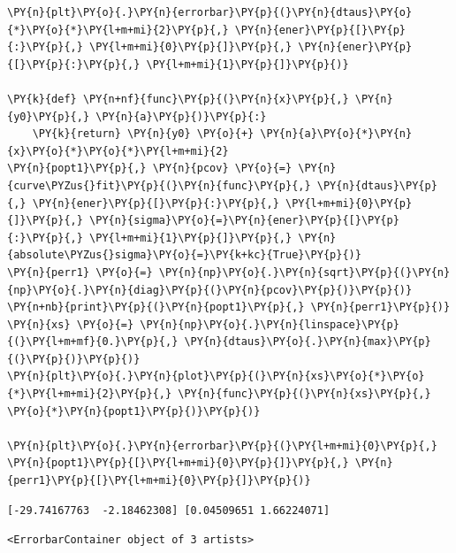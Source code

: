     \begin{tcolorbox}[breakable, size=fbox, boxrule=1pt, pad at break*=1mm,colback=cellbackground, colframe=cellborder]
\begin{Verbatim}[commandchars=\\\{\}]
\PY{n}{plt}\PY{o}{.}\PY{n}{errorbar}\PY{p}{(}\PY{n}{dtaus}\PY{o}{*}\PY{o}{*}\PY{l+m+mi}{2}\PY{p}{,} \PY{n}{ener}\PY{p}{[}\PY{p}{:}\PY{p}{,} \PY{l+m+mi}{0}\PY{p}{]}\PY{p}{,} \PY{n}{ener}\PY{p}{[}\PY{p}{:}\PY{p}{,} \PY{l+m+mi}{1}\PY{p}{]}\PY{p}{)}

\PY{k}{def} \PY{n+nf}{func}\PY{p}{(}\PY{n}{x}\PY{p}{,} \PY{n}{y0}\PY{p}{,} \PY{n}{a}\PY{p}{)}\PY{p}{:}
    \PY{k}{return} \PY{n}{y0} \PY{o}{+} \PY{n}{a}\PY{o}{*}\PY{n}{x}\PY{o}{*}\PY{o}{*}\PY{l+m+mi}{2}
\PY{n}{popt1}\PY{p}{,} \PY{n}{pcov} \PY{o}{=} \PY{n}{curve\PYZus{}fit}\PY{p}{(}\PY{n}{func}\PY{p}{,} \PY{n}{dtaus}\PY{p}{,} \PY{n}{ener}\PY{p}{[}\PY{p}{:}\PY{p}{,} \PY{l+m+mi}{0}\PY{p}{]}\PY{p}{,} \PY{n}{sigma}\PY{o}{=}\PY{n}{ener}\PY{p}{[}\PY{p}{:}\PY{p}{,} \PY{l+m+mi}{1}\PY{p}{]}\PY{p}{,} \PY{n}{absolute\PYZus{}sigma}\PY{o}{=}\PY{k+kc}{True}\PY{p}{)}
\PY{n}{perr1} \PY{o}{=} \PY{n}{np}\PY{o}{.}\PY{n}{sqrt}\PY{p}{(}\PY{n}{np}\PY{o}{.}\PY{n}{diag}\PY{p}{(}\PY{n}{pcov}\PY{p}{)}\PY{p}{)}
\PY{n+nb}{print}\PY{p}{(}\PY{n}{popt1}\PY{p}{,} \PY{n}{perr1}\PY{p}{)}
\PY{n}{xs} \PY{o}{=} \PY{n}{np}\PY{o}{.}\PY{n}{linspace}\PY{p}{(}\PY{l+m+mf}{0.}\PY{p}{,} \PY{n}{dtaus}\PY{o}{.}\PY{n}{max}\PY{p}{(}\PY{p}{)}\PY{p}{)}
\PY{n}{plt}\PY{o}{.}\PY{n}{plot}\PY{p}{(}\PY{n}{xs}\PY{o}{*}\PY{o}{*}\PY{l+m+mi}{2}\PY{p}{,} \PY{n}{func}\PY{p}{(}\PY{n}{xs}\PY{p}{,} \PY{o}{*}\PY{n}{popt1}\PY{p}{)}\PY{p}{)}

\PY{n}{plt}\PY{o}{.}\PY{n}{errorbar}\PY{p}{(}\PY{l+m+mi}{0}\PY{p}{,} \PY{n}{popt1}\PY{p}{[}\PY{l+m+mi}{0}\PY{p}{]}\PY{p}{,} \PY{n}{perr1}\PY{p}{[}\PY{l+m+mi}{0}\PY{p}{]}\PY{p}{)}
\end{Verbatim}
\end{tcolorbox}

    \begin{Verbatim}[commandchars=\\\{\}]
[-29.74167763  -2.18462308] [0.04509651 1.66224071]
    \end{Verbatim}

            \begin{tcolorbox}[breakable, size=fbox, boxrule=.5pt, pad at break*=1mm, opacityfill=0]
\begin{Verbatim}[commandchars=\\\{\}]
<ErrorbarContainer object of 3 artists>
\end{Verbatim}
\end{tcolorbox}
        
